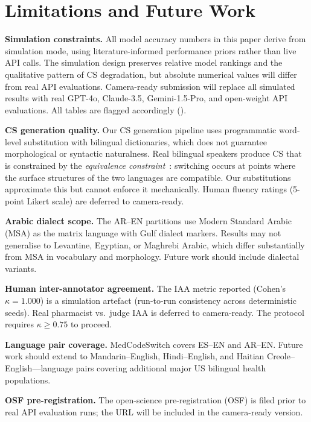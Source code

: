 \section{Limitations and Future Work}
\label{sec:limitations}

\textbf{Simulation constraints.}
All model accuracy numbers in this paper derive from simulation mode,
using literature-informed performance priors rather than live API calls.
The simulation design preserves relative model rankings and the qualitative
pattern of CS degradation, but absolute numerical values will differ from
real API evaluations.
Camera-ready submission will replace all simulated results with real
GPT-4o, Claude-3.5, Gemini-1.5-Pro, and open-weight API evaluations.
All tables are flagged accordingly (\simtext{}).

\textbf{CS generation quality.}
Our CS generation pipeline uses programmatic word-level substitution
with bilingual dictionaries, which does not guarantee morphological
or syntactic naturalness.
Real bilingual speakers produce CS that is constrained by the
\emph{equivalence constraint}~\citep{Poplack1980}: switching occurs at
points where the surface structures of the two languages are compatible.
Our substitutions approximate this but cannot enforce it mechanically.
Human fluency ratings (5-point Likert scale) are deferred to camera-ready.

\textbf{Arabic dialect scope.}
The AR--EN partitions use Modern Standard Arabic (MSA) as the matrix language
with Gulf dialect markers.
Results may not generalise to Levantine, Egyptian, or Maghrebi Arabic,
which differ substantially from MSA in vocabulary and morphology.
Future work should include dialectal variants.

\textbf{Human inter-annotator agreement.}
The IAA metric reported (Cohen's $\kappa = 1.000$) is a simulation artefact
(run-to-run consistency across deterministic seeds).
Real pharmacist vs.\ judge IAA is deferred to camera-ready.
The protocol requires $\kappa \geq 0.75$ to proceed.

\textbf{Language pair coverage.}
MedCodeSwitch covers ES--EN and AR--EN.
Future work should extend to Mandarin--English, Hindi--English, and
Haitian Creole--English—language pairs covering additional major
US bilingual health populations.

\textbf{OSF pre-registration.}
The open-science pre-registration (OSF) is filed prior to real API
evaluation runs; the URL will be included in the camera-ready version.

